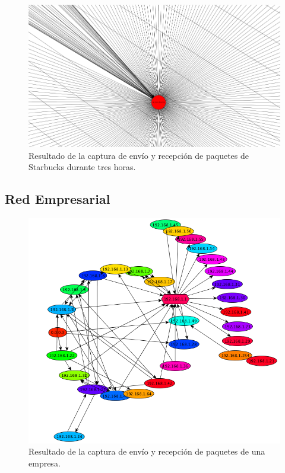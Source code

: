 \documentclass[10pt, a4paper]{article}
\begin{document}
\begin{figure}[H] %
\begin{center}
\includegraphics[width=400pt]{../imgs/starbucks30_3.png}
\caption{Resultado de la captura de envío y recepción de paquetes de Starbucks durante tres horas.}
\end{center}
\end{figure}


\subsection{Red Empresarial}


\begin{figure}[H] %
\begin{center}
\includegraphics[width=400pt]{../imgs/tiargsa_entero.png}
\caption{Resultado de la captura de envío y recepción de paquetes de una empresa.}
\end{center}
\end{figure}
\end{document}
